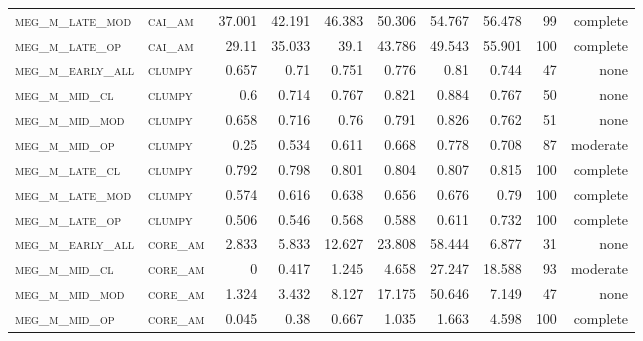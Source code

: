 \begin{landscape}
\begin{center}
\begin{footnotesize}
\begin{longtable}{llrrrrr|rrr}
\textsc{meg\_m\_late\_mod } & \textsc{cai\_am   }    & 37.001   & 42.191   & 46.383   & 50.306   & 54.767     & 56.478        & 99            & complete              \\
\textsc{meg\_m\_late\_op  } & \textsc{cai\_am   }    & 29.11    & 35.033   & 39.1     & 43.786   & 49.543     & 55.901        & 100           & complete             \\
\textsc{meg\_m\_early\_all} & \textsc{clumpy    }    & 0.657    & 0.71     & 0.751    & 0.776    & 0.81       & 0.744         & 47            & none              \\
\textsc{meg\_m\_mid\_cl   } & \textsc{clumpy    }    & 0.6      & 0.714    & 0.767    & 0.821    & 0.884      & 0.767         & 50            & none               \\
\textsc{meg\_m\_mid\_mod  } & \textsc{clumpy    }    & 0.658    & 0.716    & 0.76     & 0.791    & 0.826      & 0.762         & 51            & none               \\
\textsc{meg\_m\_mid\_op   } & \textsc{clumpy    }    & 0.25     & 0.534    & 0.611    & 0.668    & 0.778      & 0.708         & 87            & moderate              \\
\textsc{meg\_m\_late\_cl  } & \textsc{clumpy    }    & 0.792    & 0.798    & 0.801    & 0.804    & 0.807      & 0.815         & 100           & complete             \\
\textsc{meg\_m\_late\_mod } & \textsc{clumpy    }    & 0.574    & 0.616    & 0.638    & 0.656    & 0.676      & 0.79          & 100           & complete             \\
\textsc{meg\_m\_late\_op  } & \textsc{clumpy    }    & 0.506    & 0.546    & 0.568    & 0.588    & 0.611      & 0.732         & 100           & complete             \\
\textsc{meg\_m\_early\_all} & \textsc{core\_am  }    & 2.833    & 5.833    & 12.627   & 23.808   & 58.444     & 6.877         & 31            & none             \\
\textsc{meg\_m\_mid\_cl   } & \textsc{core\_am  }    & 0        & 0.417    & 1.245    & 4.658    & 27.247     & 18.588        & 93            & moderate              \\
\textsc{meg\_m\_mid\_mod  } & \textsc{core\_am  }    & 1.324    & 3.432    & 8.127    & 17.175   & 50.646     & 7.149         & 47            & none              \\
\textsc{meg\_m\_mid\_op   } & \textsc{core\_am  }    & 0.045    & 0.38     & 0.667    & 1.035    & 1.663      & 4.598         & 100           & complete             \\

\end{longtable}
\end{footnotesize}
\end{center}
\end{landscape}
